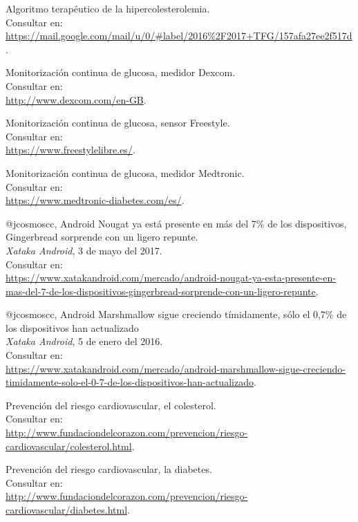 \documentclass[11pt,spanish,
		listoftables,listoffigures]
		{tfgplantilla}
\begin{document}
\begin{thebibliography}{10}
   Algoritmo terapéutico de la hipercolesterolemia.\\
   \newblock Consultar en:\\
   \url{ https://mail.google.com/mail/u/0/\#label/2016\%2F2017+TFG/157afa27ee2f517d}.

   Monitorización continua de glucosa, medidor Dexcom.\\
   \newblock Consultar en:\\
   \url{ http://www.dexcom.com/en-GB}.

   Monitorización continua de glucosa, sensor Freestyle.\\
   \newblock Consultar en:\\
   \url{ https://www.freestylelibre.es/}.

   Monitorización continua de glucosa, medidor Medtronic.\\
   \newblock Consultar en:\\
   \url{ https://www.medtronic-diabetes.com/es/}.

   @jcosmoscc,
   \newblock Android Nougat ya está presente en más del 7\% de los dispositivos, Gingerbread sorprende con un ligero repunte.\\
   \newblock \textit{Xataka Android}, 3 de mayo del 2017.\\
   \newblock Consultar en:\\
   \url{ https://www.xatakandroid.com/mercado/android-nougat-ya-esta-presente-en-mas-del-7-de-los-dispositivos-gingerbread-sorprende-con-un-ligero-repunte}.

   @jcosmoscc, 
   \newblock Android Marshmallow sigue creciendo tímidamente, sólo el 0,7\% de los dispositivos han actualizado\\
   \newblock \textit{Xataka Android}, 5 de enero del 2016.\\
   \newblock Consultar en:\\
   \url{ https://www.xatakandroid.com/mercado/android-marshmallow-sigue-creciendo-timidamente-solo-el-0-7-de-los-dispositivos-han-actualizado}.

   Prevención del riesgo cardiovascular, el colesterol.\\	
   \newblock Consultar en:\\
   \url{ http://www.fundaciondelcorazon.com/prevencion/riesgo-cardiovascular/colesterol.html}.

   Prevención del riesgo cardiovascular, la diabetes.\\	
   \newblock Consultar en:\\
   \url{ http://www.fundaciondelcorazon.com/prevencion/riesgo-cardiovascular/diabetes.html}.


\end{thebibliography}
\end{document}
